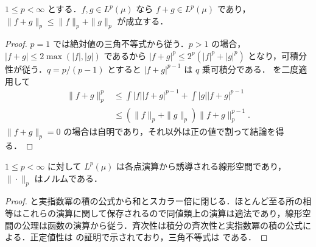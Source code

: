 \begin{prop}[Minkowskiの不等式]
$1\leq p<\infty$ とする．$f,g\in L^p(\mu)$ なら $f+g\in L^p(\mu)$ であり，$\|f+g\|_p\leq\|f\|_p+\|g\|_p$ が成立する．
\end{prop}
\begin{proof}
$p=1$ では絶対値の三角不等式から従う．$p>1$ の場合，$|f+g|\leq2\max(|f|,|g|)$ であるから $|f+g|^p\leq2^p(|f|^p+|g|^p)$ となり，可積分性が従う．$q=p/(p-1)$ とすると $|f+g|^{p-1}$ は $q$ 乗可積分である． を二度適用して
\[
\begin{aligned}
\|f+g\|_p^p
&\leq\int |f||f+g|^{p-1}+\int |g||f+g|^{p-1}\\
&\leq(\|f\|_p+\|g\|_p)\|f+g\|_p^{p-1}.
\end{aligned}
\]
$\|f+g\|_p=0$ の場合は自明であり，それ以外は正の値で割って結論を得る．
\end{proof}
\begin{prop}[L^p のノルム空間構造]
$1\leq p<\infty$ に対して $L^p(\mu)$ は各点演算から誘導される線形空間であり，$\|\cdot\|_p$ はノルムである．
\end{prop}
\begin{proof}
 と実指数冪の積の公式から和とスカラー倍に閉じる．ほとんど至る所の相等はこれらの演算に関して保存されるので同値類上の演算は適法であり，線形空間の公理は函数の演算から従う．斉次性は積分の斉次性と実指数冪の積の公式による．正定値性は  の証明で示されており，三角不等式は  である．
\end{proof}

